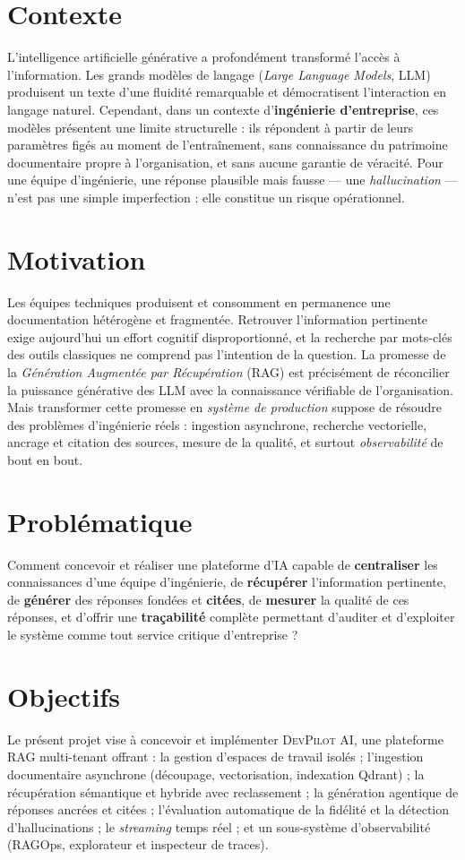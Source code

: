 \documentclass[12pt,a4paper,oneside]{report}
\newcommand{\devpilot}{\textsc{DevPilot AI}}
\begin{document}
\section*{Contexte}
L'intelligence artificielle générative a profondément transformé l'accès à
l'information. Les grands modèles de langage (\emph{Large Language Models}, LLM)
produisent un texte d'une fluidité remarquable et démocratisent l'interaction en
langage naturel. Cependant, dans un contexte d'\textbf{ingénierie d'entreprise},
ces modèles présentent une limite structurelle : ils répondent à partir de leurs
paramètres figés au moment de l'entraînement, sans connaissance du patrimoine
documentaire propre à l'organisation, et sans aucune garantie de véracité. Pour
une équipe d'ingénierie, une réponse plausible mais fausse — une
\emph{hallucination} — n'est pas une simple imperfection : elle constitue un
risque opérationnel.

\section*{Motivation}
Les équipes techniques produisent et consomment en permanence une documentation
hétérogène et fragmentée. Retrouver l'information pertinente exige aujourd'hui un
effort cognitif disproportionné, et la recherche par mots-clés des outils
classiques ne comprend pas l'intention de la question. La promesse de la
\emph{Génération Augmentée par Récupération} (RAG) est précisément de réconcilier
la puissance générative des LLM avec la connaissance vérifiable de l'organisation.
Mais transformer cette promesse en \emph{système de production} suppose de
résoudre des problèmes d'ingénierie réels : ingestion asynchrone, recherche
vectorielle, ancrage et citation des sources, mesure de la qualité, et surtout
\emph{observabilité} de bout en bout.

\section*{Problématique}
Comment concevoir et réaliser une plateforme d'IA capable de \textbf{centraliser}
les connaissances d'une équipe d'ingénierie, de \textbf{récupérer} l'information
pertinente, de \textbf{générer} des réponses fondées et \textbf{citées}, de
\textbf{mesurer} la qualité de ces réponses, et d'offrir une \textbf{traçabilité}
complète permettant d'auditer et d'exploiter le système comme tout service
critique d'entreprise ?

\section*{Objectifs}
Le présent projet vise à concevoir et implémenter \devpilot{}, une plateforme RAG
multi-tenant offrant : la gestion d'espaces de travail isolés ; l'ingestion
documentaire asynchrone (découpage, vectorisation, indexation Qdrant) ; la
récupération sémantique et hybride avec reclassement ; la génération agentique de
réponses ancrées et citées ; l'évaluation automatique de la fidélité et la
détection d'hallucinations ; le \emph{streaming} temps réel ; et un sous-système
d'observabilité (RAGOps, explorateur et inspecteur de traces).
\end{document}
